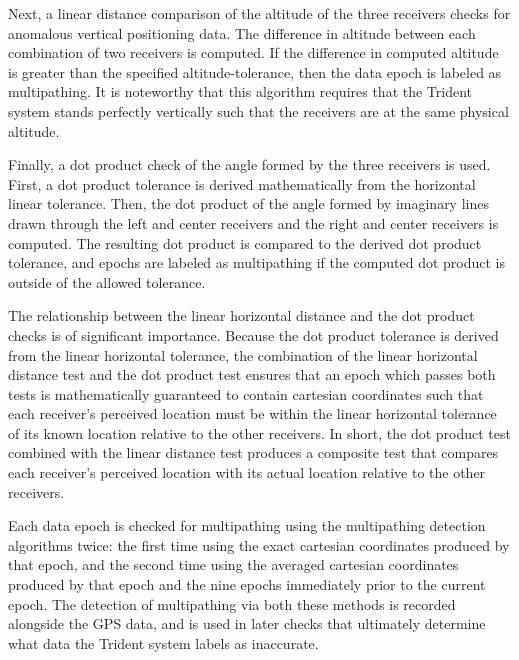 \documentclass[12pt]{article}
\begin{document}
Next, a linear distance comparison of the altitude of the three receivers checks for anomalous vertical positioning data. The difference in altitude between each combination of two receivers is computed. If the difference in computed altitude is greater than the specified altitude-tolerance, then the data epoch is labeled as multipathing. It is noteworthy that this algorithm requires that the Trident system stands perfectly vertically such that the receivers are at the same physical altitude.

Finally, a dot product check of the angle formed by the three receivers is used. First, a dot product tolerance is derived mathematically from the horizontal linear tolerance. Then, the dot product of the angle formed by imaginary lines drawn through the left and center receivers and the right and center receivers is computed. The resulting dot product is compared to the derived dot product tolerance, and epochs are labeled as multipathing if the computed dot product is outside of the allowed tolerance.

The relationship between the linear horizontal distance and the dot product checks is of significant importance. Because the dot product tolerance is derived from the linear horizontal tolerance, the combination of the linear horizontal distance test and the dot product test ensures that an epoch which passes both tests is mathematically guaranteed to contain cartesian coordinates such that each receiver’s perceived location must be within the linear horizontal tolerance of its known location relative to the other receivers. In short, the dot product test combined with the linear distance test produces a composite test that compares each receiver’s perceived location with its actual location relative to the other receivers.

Each data epoch is checked for multipathing using the multipathing detection algorithms twice: the first time using the exact cartesian coordinates produced by that epoch, and the second time using the averaged cartesian coordinates produced by that epoch and the nine epochs immediately prior to the current epoch. The detection of multipathing via both these methods is recorded alongside the GPS data, and is used in later checks that ultimately determine what data the Trident system labels as inaccurate.
\end{document}
